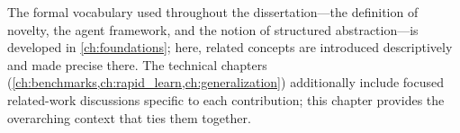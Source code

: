 The formal vocabulary used throughout the dissertation---the definition of novelty, the agent framework, and the notion of structured abstraction---is developed in \cref{ch:foundations}; here, related concepts are introduced descriptively and made precise there. The technical chapters (\cref{ch:benchmarks,ch:rapid_learn,ch:generalization}) additionally include focused related-work discussions specific to each contribution; this chapter provides the overarching context that ties them together.
















